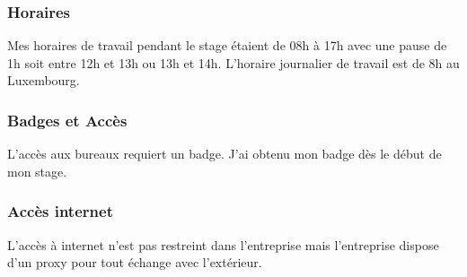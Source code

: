 \subsubsection*{Horaires}
Mes horaires de travail pendant le stage étaient de 08h à 17h avec une pause de 1h soit entre 12h et 13h ou 13h et 14h. L'horaire journalier de travail est de 8h au Luxembourg.

\subsubsection*{Badges et Accès}
L'accès aux bureaux requiert un badge. J'ai obtenu mon badge dès le début de mon stage.

\subsubsection*{Accès internet}
L'accès à internet n'est pas restreint dans l'entreprise mais l'entreprise dispose d'un proxy pour tout échange avec l'extérieur.